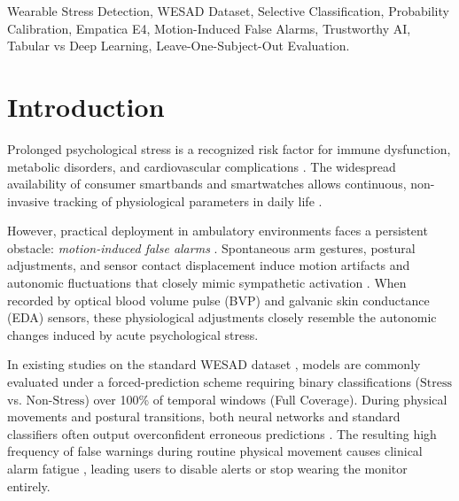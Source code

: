 \documentclass[conference]{IEEEtran}
\begin{document}
\begin{IEEEkeywords}
Wearable Stress Detection, WESAD Dataset, Selective Classification, Probability Calibration, Empatica E4, Motion-Induced False Alarms, Trustworthy AI, Tabular vs Deep Learning, Leave-One-Subject-Out Evaluation.
\end{IEEEkeywords}

\section{Introduction}
Prolonged psychological stress is a recognized risk factor for immune dysfunction, metabolic disorders, and cardiovascular complications \cite{cohen2007psychological, schneiderman2005stress, can2019stress}. The widespread availability of consumer smartbands and smartwatches allows continuous, non-invasive tracking of physiological parameters in daily life \cite{gjoreski2016continuous, schmidt2018wesad, sano2018multimodal}.

However, practical deployment in ambulatory environments faces a persistent obstacle: \textit{motion-induced false alarms} \cite{schumm2008effect, tamura2014wearable, zhang2014troika}. Spontaneous arm gestures, postural adjustments, and sensor contact displacement induce motion artifacts and autonomic fluctuations that closely mimic sympathetic activation \cite{boucsein2012electrodermal}. When recorded by optical blood volume pulse (BVP) and galvanic skin conductance (EDA) sensors, these physiological adjustments closely resemble the autonomic changes induced by acute psychological stress.

In existing studies on the standard WESAD dataset \cite{schmidt2018wesad, siirtola2019continuous, bobade2020stress, dalmeida2021hrv, behinaein2021transformer, bottcher2023detection}, models are commonly evaluated under a forced-prediction scheme requiring binary classifications ($\text{Stress}$ vs. $\text{Non-Stress}$) over 100\% of temporal windows (Full Coverage). During physical movements and postural transitions, both neural networks and standard classifiers often output overconfident erroneous predictions \cite{guo2017calibration}. The resulting high frequency of false warnings during routine physical movement causes clinical alarm fatigue \cite{sendelbach2013alarm}, leading users to disable alerts or stop wearing the monitor entirely.
\end{document}
